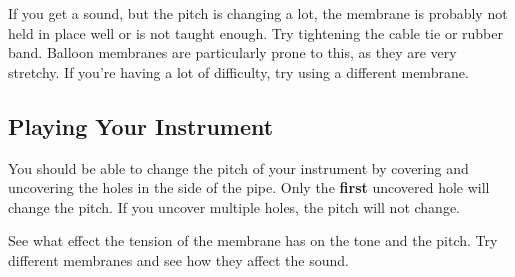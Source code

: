 \documentclass{article}
\begin{document}
If you get a sound, but the pitch is changing a lot, the membrane is probably not held in place well or is not taught enough. Try tightening the cable tie or rubber band. Balloon membranes are particularly prone to this, as they are very stretchy. If you're having a lot of difficulty, try using a different membrane.

\subsection{Playing Your Instrument}

You should be able to change the pitch of your instrument by covering and uncovering the holes in the side of the pipe. Only the \textbf{first} uncovered hole will change the pitch. If you uncover multiple holes, the pitch will not change.

See what effect the tension of the membrane has on the tone and the pitch. Try different membranes and see how they affect the sound.
\end{document}
